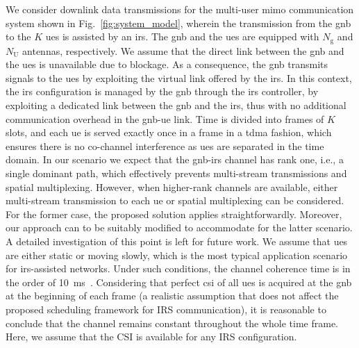 We consider downlink data transmissions for the multi-user \gls{mimo} communication system shown in Fig.~\ref{fig:system_model}, wherein the transmission from the \gls{gnb} to the $K$ \glspl{ue} is assisted by an \gls{irs}.
The \gls{gnb} and the \glspl{ue} are equipped with $N_{\mathrm g}$ and $N_{\mathrm U}$ antennas, respectively. We assume that the direct link between the \gls{gnb} and the \glspl{ue} is unavailable due to blockage. As a consequence, the \gls{gnb} transmits signals to the \glspl{ue} by exploiting the virtual link offered by the \gls{irs}. In this context, the \gls{irs} configuration is managed by the \gls{gnb} through the \gls{irs} controller, by exploiting a dedicated link between the \gls{gnb} and the \gls{irs}, thus with no additional communication overhead in the \gls{gnb}-\gls{ue} link.
Time is divided into frames of $K$ slots, and each \gls{ue} is served exactly once in a frame in a \gls{tdma} fashion, which ensures there is no co-channel interference as \glspl{ue} are separated in the time domain. In our scenario we expect that the \gls{gnb}-\gls{irs} channel has rank one, i.e., a single dominant path, which effectively prevents multi-stream transmissions and spatial multiplexing. 
However, when higher-rank channels are available, either multi-stream transmission to each \gls{ue} or spatial multiplexing can be considered. For the former case, the proposed solution applies straightforwardly. 
Moreover, our approach can to be suitably modified to accommodate for the latter scenario. A detailed investigation of this point is left for future work.
We assume that \glspl{ue} are either static or moving slowly, which is the most typical application scenario for \gls{irs}-assisted networks. Under such conditions, the channel coherence time is in the order of 10~ms~\cite[Fig.~5]{lu2020positioning}. Considering that perfect \gls{csi} of all \glspl{ue} is acquired at the \gls{gnb} at the beginning of each frame (a realistic assumption that does not affect the proposed scheduling framework for IRS communication), it is reasonable to conclude that the channel remains constant throughout the whole time frame. Here, we assume that the CSI is available for any IRS configuration.

